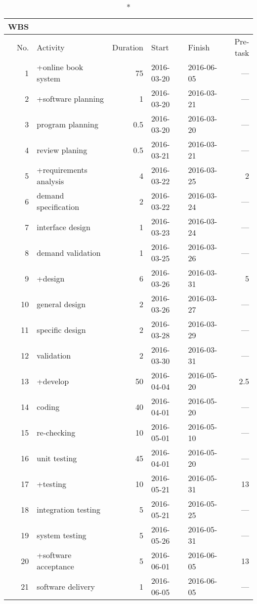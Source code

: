 \documentclass[a4paper,11pt]{article}
\begin{document}
\begin{center}
\begin{longtable}{|r|l|r|l|l|r|}
\caption*{WBS} \\
\hline No. & Activity               & Duration    & Start      & Finish     & Pre-task \\
\hline 1   & +online book system    & 75          & 2016-03-20 & 2016-06-05 & --- \\
\hline 2   & +software planning     & 1           & 2016-03-20 & 2016-03-21 & --- \\
\hline 3   & program planning       & 0.5         & 2016-03-20 & 2016-03-20 & --- \\
\hline 4   & review planing         & 0.5         & 2016-03-21 & 2016-03-21 & --- \\
\hline 5   & +requirements analysis & 4           & 2016-03-22 & 2016-03-25 & 2   \\
\hline 6   & demand specification   & 2           & 2016-03-22 & 2016-03-24 & --- \\
\hline 7   & interface design       & 1           & 2016-03-23 & 2016-03-24 & --- \\
\hline 8   & demand validation      & 1           & 2016-03-25 & 2016-03-26 & --- \\
\hline 9   & +design                & 6           & 2016-03-26 & 2016-03-31 & 5   \\
\hline 10  & general design         & 2           & 2016-03-26 & 2016-03-27 & --- \\
\hline 11  & specific design        & 2           & 2016-03-28 & 2016-03-29 & --- \\
\hline 12  & validation             & 2           & 2016-03-30 & 2016-03-31 & --- \\
\hline 13  & +develop               & 50          & 2016-04-04 & 2016-05-20 & 2.5 \\
\hline 14  & coding                 & 40          & 2016-04-01 & 2016-05-20 & --- \\
\hline 15  & re-checking            & 10          & 2016-05-01 & 2016-05-10 & --- \\
\hline 16  & unit testing           & 45          & 2016-04-01 & 2016-05-20 & --- \\
\hline 17  & +testing               & 10          & 2016-05-21 & 2016-05-31 & 13  \\
\hline 18  & integration testing    & 5           & 2016-05-21 & 2016-05-25 & --- \\
\hline 19  & system testing         & 5           & 2016-05-26 & 2016-05-31 & --- \\
\hline 20  & +software acceptance   & 5           & 2016-06-01 & 2016-06-05 & 13  \\
\hline 21  & software delivery      & 1           & 2016-06-05 & 2016-06-05 & --- \\
\hline 
\end{longtable}
\end{center}
\end{document}
